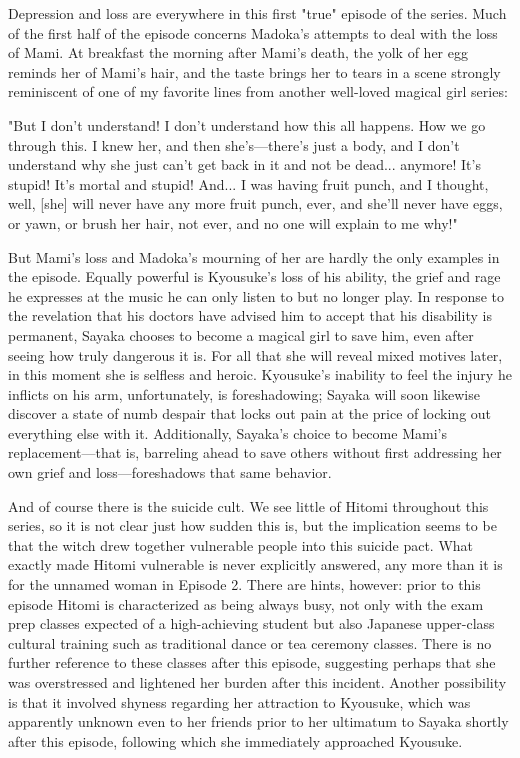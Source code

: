 Depression and loss are everywhere in this first "true" episode of the series. Much of the first half of the episode concerns Madoka's attempts to deal with the loss of Mami. At breakfast the morning after Mami's death, the yolk of her egg reminds her of Mami's hair, and the taste brings her to tears in a scene strongly reminiscent of one of my favorite lines from another well-loved magical girl series:

"But I don't understand! I don't understand how this all happens. How we go through this. I knew her, and then she's—there's just a body, and I don't understand why she just can't get back in it and not be dead... anymore! It's stupid! It's mortal and stupid! And... I was having fruit punch, and I thought, well, [she] will never have any more fruit punch, ever, and she'll never have eggs, or yawn, or brush her hair, not ever, and no one will explain to me why!" \cite{ref39}

But Mami's loss and Madoka's mourning of her are hardly the only examples in the episode. Equally powerful is Kyousuke's loss of his ability, the grief and rage he expresses at the music he can only listen to but no longer play. In response to the revelation that his doctors have advised him to accept that his disability is permanent, Sayaka chooses to become a magical girl to save him, even after seeing how truly dangerous it is. For all that she will reveal mixed motives later, in this moment she is selfless and heroic. Kyousuke's inability to feel the injury he inflicts on his arm, unfortunately, is foreshadowing; Sayaka will soon likewise discover a state of numb despair that locks out pain at the price of locking out everything else with it. Additionally, Sayaka's choice to become Mami's replacement—that is, barreling ahead to save others without first addressing her own grief and loss—foreshadows that same behavior.

And of course there is the suicide cult. We see little of Hitomi throughout this series, so it is not clear just how sudden this is, but the implication seems to be that the witch drew together vulnerable people into this suicide pact. What exactly made Hitomi vulnerable is never explicitly answered, any more than it is for the unnamed woman in Episode 2. There are hints, however: prior to this episode Hitomi is characterized as being always busy, not only with the exam prep classes expected of a high-achieving student but also Japanese upper-class cultural training such as traditional dance or tea ceremony classes. There is no further reference to these classes after this episode, suggesting perhaps that she was overstressed and lightened her burden after this incident. Another possibility is that it involved shyness regarding her attraction to Kyousuke, which was apparently unknown even to her friends prior to her ultimatum to Sayaka shortly after this episode, following which she immediately approached Kyousuke.

